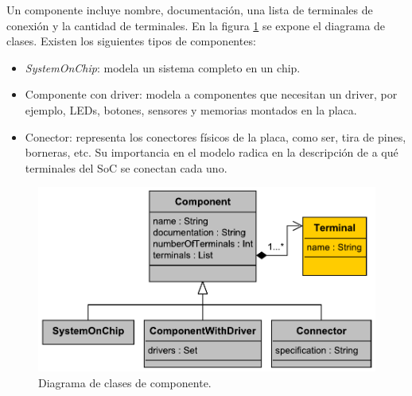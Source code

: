 Un componente incluye nombre, documentación, una lista de terminales de conexión y la cantidad de terminales. En la figura \ref{fig:Component} se expone el diagrama de clases. Existen los siguientes tipos de componentes:

\begin{itemize}
\item
\emph{SystemOnChip}: modela un sistema completo en un chip.
\item
Componente con driver: modela a componentes que necesitan un driver, por ejemplo, LEDs, botones, sensores y memorias montados en la placa.
\item
Conector: representa los conectores físicos de la placa, como ser, tira de pines, borneras, etc. Su importancia en el modelo radica en la descripción de a qué terminales del SoC se conectan cada uno.
\end{itemize}

\begin{figure}[!htbp]
\begin{center}  %
\includegraphics*[width=14cm]{Figures/Component.pdf}
\par\caption{Diagrama de clases de componente.}\label{fig:Component}
\end{center}
\end{figure}
